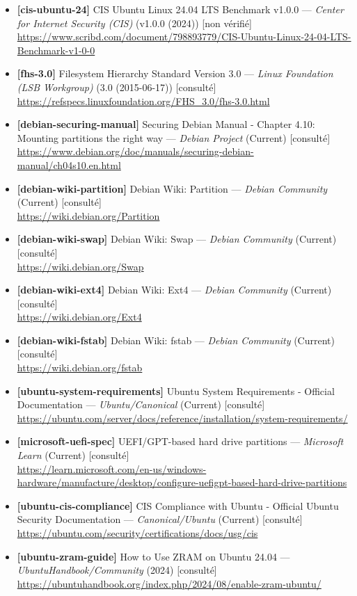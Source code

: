 \documentclass[10pt,a4paper]{article}
\begin{document}
\begin{itemize}[leftmargin=1.6em]
\item \textbf{[cis-ubuntu-24]} CIS Ubuntu Linux 24.04 LTS Benchmark v1.0.0 --- \textit{Center for Internet Security (CIS)} (v1.0.0 (2024)) \textcolor{cMed}{[non v\'erifi\'e]}\\ \url{https://www.scribd.com/document/798893779/CIS-Ubuntu-Linux-24-04-LTS-Benchmark-v1-0-0}
\item \textbf{[fhs-3.0]} Filesystem Hierarchy Standard Version 3.0 --- \textit{Linux Foundation (LSB Workgroup)} (3.0 (2015-06-17)) \textcolor{cOk}{[consult\'e]}\\ \url{https://refspecs.linuxfoundation.org/FHS_3.0/fhs-3.0.html}
\item \textbf{[debian-securing-manual]} Securing Debian Manual - Chapter 4.10: Mounting partitions the right way --- \textit{Debian Project} (Current) \textcolor{cOk}{[consult\'e]}\\ \url{https://www.debian.org/doc/manuals/securing-debian-manual/ch04s10.en.html}
\item \textbf{[debian-wiki-partition]} Debian Wiki: Partition --- \textit{Debian Community} (Current) \textcolor{cOk}{[consult\'e]}\\ \url{https://wiki.debian.org/Partition}
\item \textbf{[debian-wiki-swap]} Debian Wiki: Swap --- \textit{Debian Community} (Current) \textcolor{cOk}{[consult\'e]}\\ \url{https://wiki.debian.org/Swap}
\item \textbf{[debian-wiki-ext4]} Debian Wiki: Ext4 --- \textit{Debian Community} (Current) \textcolor{cOk}{[consult\'e]}\\ \url{https://wiki.debian.org/Ext4}
\item \textbf{[debian-wiki-fstab]} Debian Wiki: fstab --- \textit{Debian Community} (Current) \textcolor{cOk}{[consult\'e]}\\ \url{https://wiki.debian.org/fstab}
\item \textbf{[ubuntu-system-requirements]} Ubuntu System Requirements - Official Documentation --- \textit{Ubuntu/Canonical} (Current) \textcolor{cOk}{[consult\'e]}\\ \url{https://ubuntu.com/server/docs/reference/installation/system-requirements/}
\item \textbf{[microsoft-uefi-spec]} UEFI/GPT-based hard drive partitions --- \textit{Microsoft Learn} (Current) \textcolor{cOk}{[consult\'e]}\\ \url{https://learn.microsoft.com/en-us/windows-hardware/manufacture/desktop/configure-uefigpt-based-hard-drive-partitions}
\item \textbf{[ubuntu-cis-compliance]} CIS Compliance with Ubuntu - Official Ubuntu Security Documentation --- \textit{Canonical/Ubuntu} (Current) \textcolor{cOk}{[consult\'e]}\\ \url{https://ubuntu.com/security/certifications/docs/usg/cis}
\item \textbf{[ubuntu-zram-guide]} How to Use ZRAM on Ubuntu 24.04 --- \textit{UbuntuHandbook/Community} (2024) \textcolor{cOk}{[consult\'e]}\\ \url{https://ubuntuhandbook.org/index.php/2024/08/enable-zram-ubuntu/}
\end{itemize}
\end{document}
